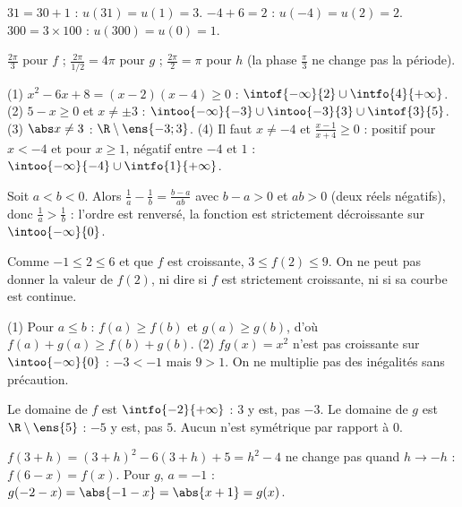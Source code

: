 \begin{solution}
$31=30+1$ : $u(31)=u(1)=3$. $-4+6=2$ : $u(-4)=u(2)=2$. $300=3\times100$ : $u(300)=u(0)=1$.
\end{solution}
\begin{solution}
$\frac{2\pi}{3}$ pour $f$ ; $\frac{2\pi}{1/2}=4\pi$ pour $g$ ; $\frac{2\pi}{2}=\pi$ pour $h$ (la phase $\frac\pi3$ ne change pas la période).
\end{solution}
\begin{solution}
(1) $x^2-6x+8=(x-2)(x-4)\ge0$ : $\intof{-\infty}{2}\cup\intfo{4}{+\infty}$. (2) $5-x\ge0$ et $x\ne\pm3$ : $\intoo{-\infty}{-3}\cup\intoo{-3}{3}\cup\intof{3}{5}$. (3) $\abs x\ne3$ : $\R\setminus\ens{-3;3}$. (4) Il faut $x\ne-4$ et $\frac{x-1}{x+4}\ge0$ : positif pour $x<-4$ et pour $x\ge1$, négatif entre $-4$ et $1$ : $\intoo{-\infty}{-4}\cup\intfo{1}{+\infty}$.
\end{solution}
\begin{solution}
Soit $a<b<0$. Alors $\frac1a-\frac1b=\frac{b-a}{ab}$ avec $b-a>0$ et $ab>0$ (deux réels négatifs), donc $\frac1a>\frac1b$ : l'ordre est renversé, la fonction est strictement décroissante sur $\intoo{-\infty}{0}$.
\end{solution}
\begin{solution}
Comme $-1\le2\le6$ et que $f$ est croissante, $3\le f(2)\le9$. On ne peut pas donner la valeur de $f(2)$, ni dire si $f$ est strictement croissante, ni si sa courbe est continue.
\end{solution}
\begin{solution}
(1) Pour $a\le b$ : $f(a)\ge f(b)$ et $g(a)\ge g(b)$, d'où $f(a)+g(a)\ge f(b)+g(b)$. (2) $fg(x)=x^2$ n'est pas croissante sur $\intoo{-\infty}{0}$ : $-3<-1$ mais $9>1$. On ne multiplie pas des inégalités sans précaution.
\end{solution}
\begin{solution}
Le domaine de $f$ est $\intfo{-2}{+\infty}$ : $3$ y est, pas $-3$. Le domaine de $g$ est $\R\setminus\ens{5}$ : $-5$ y est, pas $5$. Aucun n'est symétrique par rapport à $0$.
\end{solution}
\begin{solution}
$f(3+h)=(3+h)^2-6(3+h)+5=h^2-4$ ne change pas quand $h\to-h$ : $f(6-x)=f(x)$. Pour $g$, $a=-1$ : $g(-2-x)=\abs{-1-x}=\abs{x+1}=g(x)$.
\end{solution}
